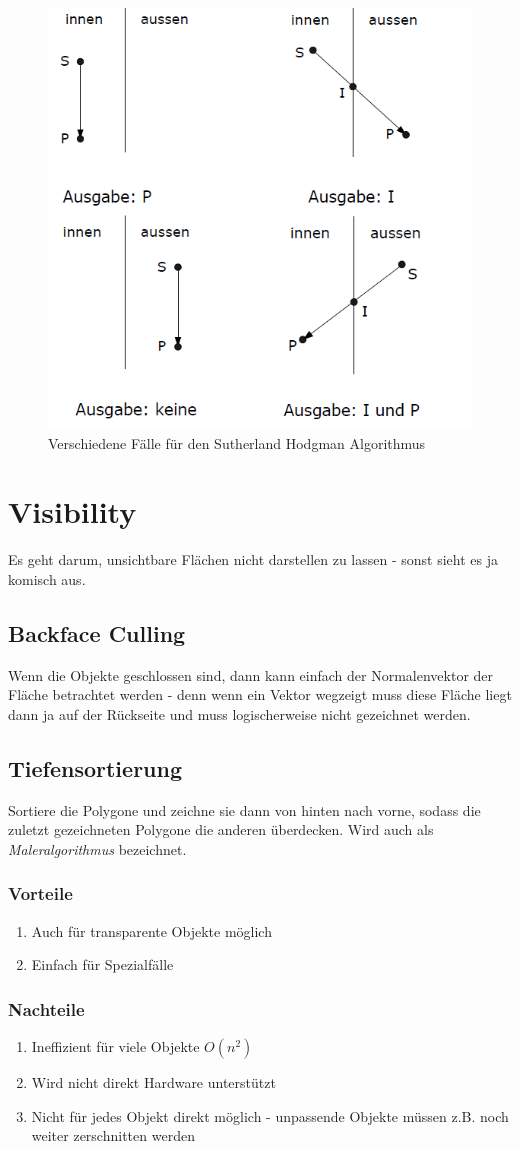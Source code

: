 	\begin{figure}[!ht]
		\centering
		\includegraphics[width=0.5\linewidth]{fig/sutherland_hodgman}
		\caption{Verschiedene Fälle für den Sutherland Hodgman Algorithmus}
		\label{fig:sutherland_hodgman}
	\end{figure}

\section{Visibility}
Es geht darum, unsichtbare Flächen nicht darstellen zu lassen - sonst sieht es ja komisch aus.

\subsection{Backface Culling}
Wenn die Objekte geschlossen sind, dann kann einfach der Normalenvektor der Fläche betrachtet werden - denn wenn ein Vektor wegzeigt muss diese Fläche liegt dann ja auf der Rückseite und muss logischerweise nicht gezeichnet werden.

\subsection{Tiefensortierung}
Sortiere die Polygone und zeichne sie dann von hinten nach vorne, sodass die zuletzt gezeichneten Polygone die anderen überdecken. Wird auch als \textit{Maleralgorithmus} bezeichnet.
\subsubsection{Vorteile}
\begin{enumerate}
	\item Auch für transparente Objekte möglich
	\item Einfach für Spezialfälle
\end{enumerate}
\subsubsection{Nachteile}
\begin{enumerate}
	\item Ineffizient für viele Objekte \(O(n^2)\)
	\item Wird nicht direkt Hardware unterstützt
	\item Nicht für jedes Objekt direkt möglich - unpassende Objekte  müssen z.B. noch weiter zerschnitten werden
\end{enumerate}
